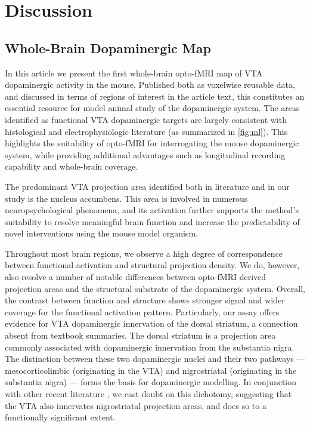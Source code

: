 \section{Discussion}

\subsection{Whole-Brain Dopaminergic Map}

In this article we present the first whole-brain opto-fMRI map of VTA dopaminergic activity in the mouse.
Published both as voxelwise reusable data, and discussed in terms of regions of interest in the article text, this constitutes an essential resource for model animal study of the dopaminergic system.
The areas identified as functional VTA dopaminergic targets are largely consistent with histological and electrophysiologic literature (as summarized in \cref{fig:ml}).
This highlights the suitability of opto-fMRI for interrogating the mouse dopaminergic system, while providing additional advantages such as longitudinal recording capability and whole-brain coverage.

The predominant VTA projection area identified both in literature and in our study is the nucleus accumbens.
This area is involved in numerous neuropsychological phenomena, and its activation further supports the method's suitability to resolve meaningful brain function and increase the predictability of novel interventions using the mouse model organism.

Throughout most brain regions, we observe a high degree of correspondence between functional activation and structural projection density.
We do, however, also resolve a number of notable differences between opto-fMRI derived projection areas and the structural substrate of the dopaminergic system.
Overall, the contrast between function and structure shows stronger signal and wider coverage for the functional activation pattern.
Particularly, our assay offers evidence for VTA dopaminergic innervation of the dorsal striatum, a connection absent from textbook summaries.
The dorsal striatum is a projection area commonly associated with dopaminergic innervation from the substantia nigra.
The distinction between these two dopaminergic nuclei and their two pathways --- mesocorticolimbic (originating in the VTA) and nigrostriatal (originating in the substantia nigra) --- forms the basis for dopaminergic modelling.
In conjunction with other recent literature \cite{Lohani2016,Pan2010}, we cast doubt on this dichotomy, suggesting that the VTA also innervates nigrostriatal projection areas, and does so to a functionally significant extent.

